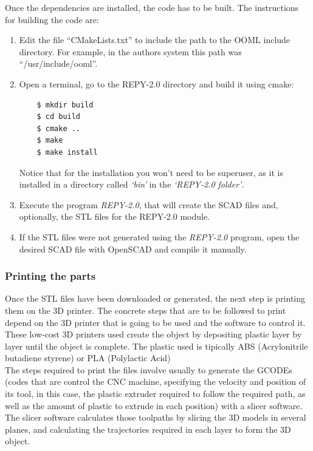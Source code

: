 Once the dependencies are installed, the code has to be built. The instructions for building the code are:
\begin{enumerate}
	\item Edit the file ``CMakeLists.txt'' to include the path to the OOML include directory. For example, in the authors system this path was ``/usr/include/ooml''.

	\item Open a terminal, go to the REPY-2.0 directory and build it using cmake:
        \Bash
		\begin{lstlisting}
	$ mkdir build
	$ cd build
	$ cmake ..
	$ make 
	$ make install
		\end{lstlisting} %
Notice that for the installation you won't need to be superuser, as it is installed in a directory called \emph{`bin'} in the \emph{`REPY-2.0 folder'}.

	\item Execute the program \emph{REPY-2.0}, that will create the SCAD files and, optionally, the STL files for the REPY-2.0 module.
	
	\item If the STL files were not generated using the \emph{REPY-2.0} program, open the desired SCAD file with OpenSCAD  and compile it manually.
\end{enumerate}

\newpage
\subsubsection{Printing the parts}

Once the STL files have been downloaded or generated, the next step is printing them on the 3D printer. The concrete steps that are to be followed to print depend on the 3D printer that is going to be used and the software to control it. These low-cost 3D printers used create the object by depositing plastic layer by layer until the object is complete. The plastic used is tipically ABS (Acrylonitrile butadiene styrene) or PLA (Polylactic Acid)\\

The steps required to print the files involve usually to generate the GCODEs (codes that are control the CNC machine, specifying the velocity and position of its tool, in this case, the plastic extruder required to follow the required path, as well as the amount of plastic to extrude in each position) with a slicer software. The slicer software calculates those toolpaths by slicing the 3D models in several planes, and calculating the trajectories required in each layer to form the 3D object.\\

